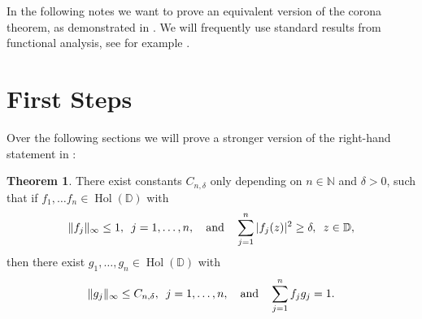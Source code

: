 \documentclass[letterpaper, 11pt]{article}
\newcommand{\D}{\mathbb{D}}
\newcommand{\N}{\mathbb{N}}
\newcommand{\1}{\mathds{1}}
\DeclareMathOperator*{\Hol}{Hol}
\theoremstyle{definition}
\newtheorem{theorem}{Theorem}
\begin{document}
In the following notes we want to prove an equivalent version of the corona theorem, as demonstrated in \cite{fischer_lieb__funktionentheorie}. We will frequently use standard results from functional analysis, see for example \cite{fana}.

\section{First Steps}

Over the following sections we will prove a stronger version of the right-hand statement in :

\begin{theorem}
  There exist constants $C_{n,\delta}$ only depending on $n \in \N$ and $\delta > 0$, such that if $f_1, \dots f_n \in \Hol(\D)$ with
  $$ \Vert f_j \Vert_\infty \leq 1, \hspace{0.5em} j = 1, \dots, n, \quad \textrm{and} \quad \sum_{j=1}^n \vert f_j(z) \vert^2 \geq \delta, \hspace{0.5em} z \in \D, $$
  then there exist $g_1, \dots, g_n \in \Hol(\D)$ with
  $$ \Vert g_j \Vert_\infty \leq C_{n,\delta}, \hspace{0.5em} j = 1, \dots, n, \quad \textrm{and} \quad \sum_{j=1}^n f_j g_j = 1. $$
\end{theorem}
\end{document}
